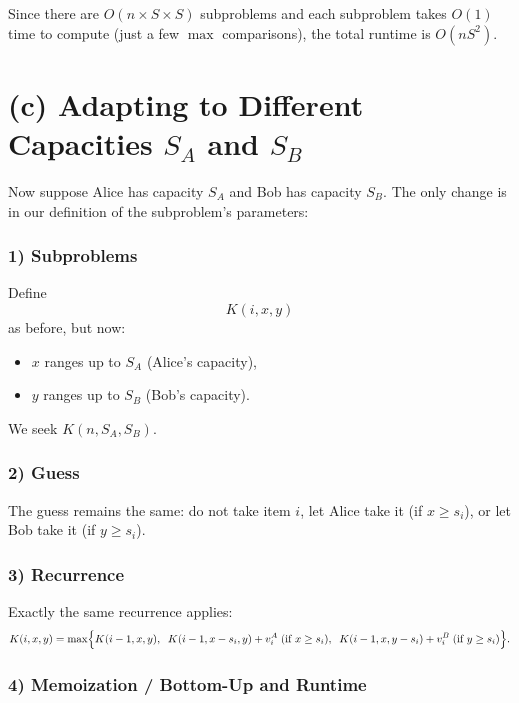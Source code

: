 \documentclass[11pt]{article}
\begin{document}
    Since there are \(O(n \times S \times S)\) subproblems and each subproblem takes \(O(1)\) time to compute (just a few \(\max\) comparisons), the total runtime is \(O(nS^2)\).
    
    \bigskip
    
    \section*{(c) Adapting to Different Capacities \(S_A\) and \(S_B\)}
    
    Now suppose Alice has capacity \(S_A\) and Bob has capacity \(S_B\). The only change is in our definition of the subproblem’s parameters:
    
    \subsubsection*{1) Subproblems}
    
    Define
    \[
    K(i, x, y)
    \]
    as before, but now:
    \begin{itemize}
        \item \(x\) ranges up to \(S_A\) (Alice's capacity),
        \item \(y\) ranges up to \(S_B\) (Bob's capacity).
    \end{itemize}
    We seek \(K(n, S_A, S_B)\).
    
    \subsubsection*{2) Guess}
    
    The guess remains the same: do not take item \(i\), let Alice take it (if \(x \ge s_i\)), or let Bob take it (if \(y \ge s_i\)).
    
    \subsubsection*{3) Recurrence}
    
    Exactly the same recurrence applies:
    \[
    K(i,x,y) 
    = 
    \max\Bigl\{
        K(i-1, x, y),\;\;
        K(i-1, x - s_i, y) + v_i^A \;\text{(if } x \ge s_i),\;\;
        K(i-1, x, y - s_i) + v_i^B \;\text{(if } y \ge s_i)
    \Bigr\}.
    \]
    
    \subsubsection*{4) Memoization / Bottom-Up and Runtime}
    
\end{document}
